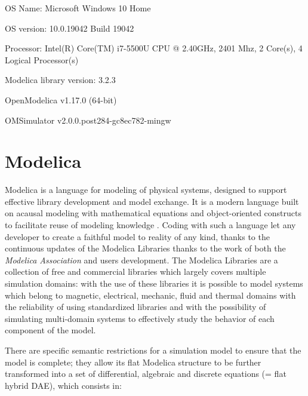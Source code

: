 \graphicspath{{Notes/Figs/}}
OS Name: Microsoft Windows 10 Home

OS version: 10.0.19042 Build 19042

Processor:	Intel(R) Core(TM) i7-5500U CPU @ 2.40GHz, 2401 Mhz, 2 Core(s), 4 Logical Processor(s)

Modelica library version: 3.2.3

OpenModelica v1.17.0 (64-bit)

OMSimulator v2.0.0.post284-gc8ec782-mingw


\section{Modelica}
Modelica is a language for modeling of physical systems, designed to support effective library development and model exchange. It is a modern language built on acausal modeling with mathematical equations and object-oriented constructs to facilitate reuse of modeling knowledge %
. Coding with such a language let any developer to create a faithful model to reality of any kind, thanks to the continuous updates of the Modelica Libraries%
 thanks to the work of both the \textit{Modelica Association} and users development. The Modelica Libraries are a collection of free and commercial libraries which largely covers multiple simulation domains: with the use of these libraries it is possible to model systems which belong to magnetic, electrical, mechanic, fluid and thermal domains with the reliability of using standardized libraries %
 and with the possibility of simulating multi-domain systems to effectively study the behavior of each component of the model.

There are specific semantic restrictions for a simulation model to ensure that the model is complete; they allow its flat Modelica structure to be further transformed into a set of differential, algebraic and discrete equations (= flat hybrid DAE), which consists in:

